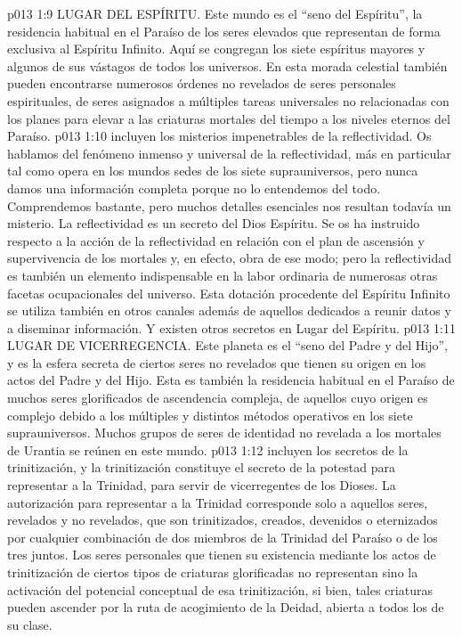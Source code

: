 \vs p013 1:9 LUGAR DEL ESPÍRITU. Este mundo es el “seno del Espíritu”, la residencia habitual en el Paraíso de los seres elevados que representan de forma exclusiva al Espíritu Infinito. Aquí se congregan los siete espíritus mayores y algunos de sus vástagos de todos los universos. En esta morada celestial también pueden encontrarse numerosos órdenes no revelados de seres personales espirituales, de seres asignados a múltiples tareas universales no relacionadas con los planes para elevar a las criaturas mortales del tiempo a los niveles eternos del Paraíso.
\vs p013 1:10 \pc {} incluyen los misterios impenetrables de la reflectividad. Os hablamos del fenómeno inmenso y universal de la reflectividad, más en particular tal como opera en los mundos sedes de los siete suprauniversos, pero nunca damos una información completa porque no lo entendemos del todo. Comprendemos bastante, pero muchos detalles esenciales nos resultan todavía un misterio. La reflectividad es un secreto del Dios Espíritu. Se os ha instruido respecto a la acción de la reflectividad en relación con el plan de ascensión y supervivencia de los mortales y, en efecto, obra de ese modo; pero la reflectividad es también un elemento indispensable en la labor ordinaria de numerosas otras facetas ocupacionales del universo. Esta dotación procedente del Espíritu Infinito se utiliza también en otros canales además de aquellos dedicados a reunir datos y a diseminar información. Y existen otros secretos en Lugar del Espíritu.
\vs p013 1:11 LUGAR DE VICERREGENCIA. Este planeta es el “seno del Padre y del Hijo”, y es la esfera secreta de ciertos seres no revelados que tienen su origen en los actos del Padre y del Hijo. Esta es también la residencia habitual en el Paraíso de muchos seres glorificados de ascendencia compleja, de aquellos cuyo origen es complejo debido a los múltiples y distintos métodos operativos en los siete suprauniversos. Muchos grupos de seres de identidad no revelada a los mortales de Urantia se reúnen en este mundo.
\vs p013 1:12 \pc {} incluyen los secretos de la trinitización, y la trinitización constituye el secreto de la potestad para representar a la Trinidad, para servir de vicerregentes de los Dioses. La autorización para representar a la Trinidad corresponde solo a aquellos seres, revelados y no revelados, que son trinitizados, creados, devenidos o eternizados por cualquier combinación de dos miembros de la Trinidad del Paraíso o de los tres juntos. Los seres personales que tienen su existencia mediante los actos de trinitización de ciertos tipos de criaturas glorificadas no representan sino la activación del potencial conceptual de esa trinitización, si bien, tales criaturas pueden ascender por la ruta de acogimiento de la Deidad, abierta a todos los de su clase.
